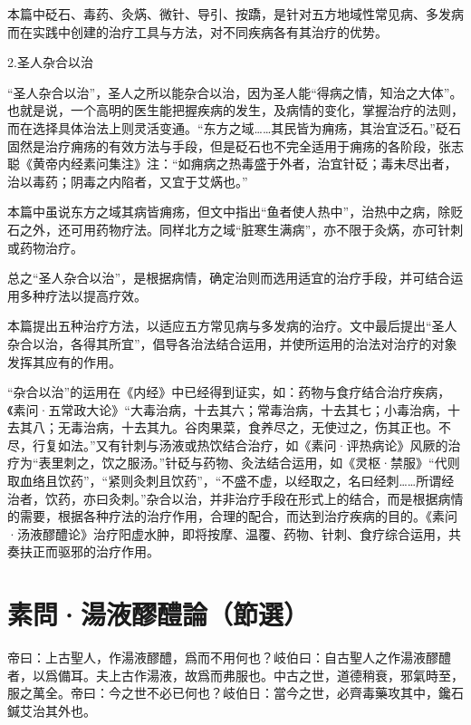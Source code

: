 \documentclass[draft,12pt]{ctexbook}
\begin{document}
本篇中砭石、毒药、灸焫、微针、导引、按蹻，是针对五方地域性常见病、多发病而在实践中创建的治疗工具与方法，对不同疾病各有其治疗的优势。

2.圣人杂合以治

“圣人杂合以治”，圣人之所以能杂合以治，因为圣人能“得病之情，知治之大体”。也就是说，一个高明的医生能把握疾病的发生，及病情的变化，掌握治疗的法则，而在选择具体治法上则灵活变通。“东方之域……其民皆为痈疡，其治宜泛石。”砭石固然是治疗痈疡的有效方法与手段，但是砭石也不完全适用于痈疡的各阶段，张志聪《黄帝内经素问集注》注：“如痈病之热毒盛于外者，治宜针砭；毒未尽出者，治以毒药；阴毒之内陷者，又宜于艾焫也。”

本篇中虽说东方之域其病皆痈疡，但文中指出“鱼者使人热中”，治热中之病，除贬石之外，还可用药物疗法。同样北方之域“脏寒生满病”，亦不限于灸焫，亦可针刺或药物治疗。

总之“圣人杂合以治”，是根据病情，确定治则而选用适宜的治疗手段，并可结合运用多种疗法以提高疗效。



本篇提出五种治疗方法，以适应五方常见病与多发病的治疗。文中最后提出“圣人杂合以治，各得其所宜”，倡导各治法结合运用，并使所运用的治法对治疗的对象发挥其应有的作用。

“杂合以治”的运用在《内经》中已经得到证实，如：药物与食疗结合治疗疾病，《素问·五常政大论》“大毒治病，十去其六；常毒治病，十去其七；小毒治病，十去其八；无毒治病，十去其九。谷肉果菜，食养尽之，无使过之，伤其正也。不尽，行复如法。”又有针刺与汤液或热饮结合治疗，如《素问·评热病论》风厥的治疗为“表里刺之，饮之服汤。”针砭与药物、灸法结合运用，如《灵枢·禁服》“代则取血络且饮药”，“紧则灸刺且饮药”，“不盛不虚，以经取之，名曰经刺……所谓经治者，饮药，亦曰灸刺。”杂合以治，并非治疗手段在形式上的结合，而是根据病情的需要，根据各种疗法的治疗作用，合理的配合，而达到治疗疾病的目的。《素问·汤液醪醴论》治疗阳虚水肿，即将按摩、温覆、药物、针刺、食疗综合运用，共奏扶正而驱邪的治疗作用。


\section{素問·湯液醪醴論（節選）}%


\begin{yuanwen}
帝曰：上古聖人，作湯液醪醴，爲而不用何也？岐伯曰：自古聖人之作湯液醪醴者，以爲備耳。夫上古作湯液，故爲而弗服也。中古之世，道德稍衰，邪氣時至，服之萬全。帝曰：今之世不必已何也？岐伯日：當今之世，必齊毒藥攻其中，鑱石鍼艾治其外也。
\end{yuanwen}
\end{document}
